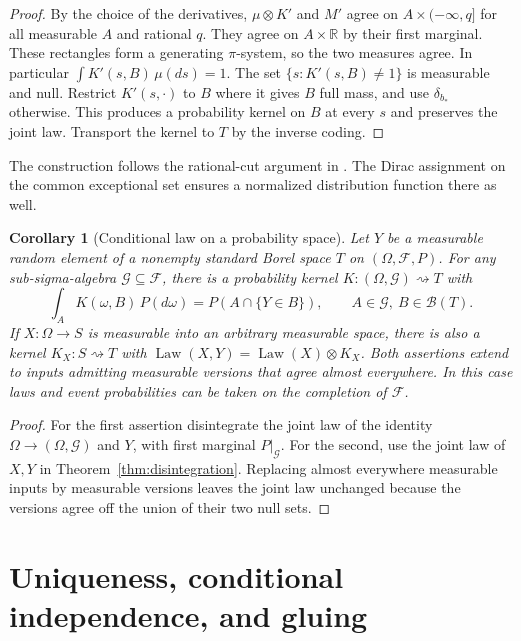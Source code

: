 \documentclass[11pt,oneside,openany]{book}
\DeclareMathOperator{\Law}{Law}
\theoremstyle{plain}
\newtheorem{corollary}[theorem]{Corollary}
\theoremstyle{definition}
\theoremstyle{remark}
\begin{document}
\begin{proof}
By the choice of the derivatives, \(\mu\otimes K'\) and \(M'\) agree on \(A\times(-\infty,q]\) for all measurable \(A\) and rational \(q\). They agree on \(A\times\mathbb R\) by their first marginal. These rectangles form a generating \(\pi\)-system, so the two measures agree. In particular \(\int K'(s,B)\,\mu(ds)=1\). The set \(\{s:K'(s,B)\ne1\}\) is measurable and null. Restrict \(K'(s,\cdot)\) to \(B\) where it gives \(B\) full mass, and use \(\delta_{b_*}\) otherwise. This produces a probability kernel on \(B\) at every \(s\) and preserves the joint law. Transport the kernel to \(T\) by the inverse coding.
\end{proof}

The construction follows the rational-cut argument in \cite[Theorem 3.4, pp.~60--61]{Kallenberg}. The Dirac assignment on the common exceptional set ensures a normalized distribution function there as well.

\begin{corollary}[Conditional law on a probability space]\label{cor:conditional-law}
Let \(Y\) be a measurable random element of a nonempty standard Borel space \(T\) on \((\Omega,\mathcal F,P)\). For any sub-sigma-algebra \(\mathcal G\subseteq\mathcal F\), there is a probability kernel \(K:(\Omega,\mathcal G)\rightsquigarrow T\) with
\[
  \int_A K(\omega,B)\,P(d\omega)=P(A\cap\{Y\in B\}),
  \qquad A\in\mathcal G,\ B\in\mathcal B(T).
\]
If \(X:\Omega\to S\) is measurable into an arbitrary measurable space, there is also a kernel \(K_X:S\rightsquigarrow T\) with \(\Law(X,Y)=\Law(X)\otimes K_X\). Both assertions extend to inputs admitting measurable versions that agree almost everywhere. In this case laws and event probabilities can be taken on the completion of \(\mathcal F\).
\end{corollary}
\begin{proof}
For the first assertion disintegrate the joint law of the identity \(\Omega\to(\Omega,\mathcal G)\) and \(Y\), with first marginal \(P|_{\mathcal G}\). For the second, use the joint law of \(X,Y\) in Theorem~\ref{thm:disintegration}. Replacing almost everywhere measurable inputs by measurable versions leaves the joint law unchanged because the versions agree off the union of their two null sets.
\end{proof}

\section{Uniqueness, conditional independence, and gluing}\label{p04-04}
\end{document}
